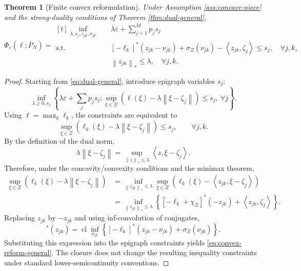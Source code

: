 \documentclass[11pt]{article}
\newtheorem{theorem}{Theorem}[section]
\newcommand{\XiSet}{\Xi}
\newcommand{\1}{\mathbf{1}}
\newcommand{\Pbar}{\bar P_N}
\newcommand{\inner}[2]{\left\langle #1,#2\right\rangle}
\newcommand{\norm}[1]{\left\lVert #1\right\rVert}
\DeclareMathOperator{\Cl}{cl}
\begin{document}
\begin{theorem}[Finite convex reformulation]\label{thm:convex-reform-general}
Under Assumption \ref{ass:concave-piece} and the strong-duality conditions of Theorem \ref{thm:dual-general},
\begin{equation}\label{eq:convex-reform-general}
\Phi_{\varepsilon}(\ell;\Pbar)=
\begin{aligned}[t]
\inf_{\lambda,s_j,z_{jk},\nu_{jk}}\quad
&\lambda\varepsilon+\sum_{j=1}^Mp_js_j\\
\mathrm{s.t.}\quad
&[-\ell_k]^*(z_{jk}-\nu_{jk})+\sigma_{\XiSet}(\nu_{jk})-\inner{z_{jk}}{\zeta_j}\le s_j,\quad \forall j,k,\\
&\norm{z_{jk}}_*\le\lambda,\quad \forall j,k.
\end{aligned}
\end{equation}
\end{theorem}

\begin{proof}
Starting from \eqref{eq:dual-general}, introduce epigraph variables $s_j$:
\begin{equation}
\inf_{\lambda\ge0,s_j}\left\{\lambda\varepsilon+\sum_jp_js_j:
\sup_{\xi\in\XiSet}\left(\ell(\xi)-\lambda\norm{\xi-\zeta_j}\right)\le s_j,\ \forall j\right\}.
\end{equation}
Using $\ell=\max_k\ell_k$, the constraints are equivalent to
\begin{equation}\label{eq:semiinf}
    \sup_{\xi\in\XiSet}\left(\ell_k(\xi)-\lambda\norm{\xi-\zeta_j}\right)\le s_j,
    \qquad \forall j,k.
\end{equation}
By the definition of the dual norm,
\begin{equation}
    \lambda\norm{\xi-\zeta_j}=\sup_{\norm{z}_{*}\le\lambda}\inner{z}{\xi-\zeta_j}.
\end{equation}
Therefore, under the concavity/convexity conditions and the minimax theorem,
\begin{align*}
\sup_{\xi\in\XiSet}\left(\ell_k(\xi)-\lambda\norm{\xi-\zeta_j}\right)
&=\inf_{\norm{z_{jk}}_*
\le\lambda}\sup_{\xi\in\XiSet}\left(\ell_k(\xi)-\inner{z_{jk}}{\xi-\zeta_j}\right)\\
&=\inf_{\norm{z_{jk}}_*
\le\lambda}\left\{[-\ell_k+\chi_{\XiSet}]^*(-z_{jk})+\inner{z_{jk}}{\zeta_j}\right\}.
\end{align*}
Replacing $z_{jk}$ by $-z_{jk}$ and using inf-convolution of conjugates,
\begin{equation}
[-\ell_k+\chi_{\XiSet}]^*(z_{jk})
=\Cl\inf_{\nu_{jk}}\left\{[-\ell_k]^*(z_{jk}-\nu_{jk})+\sigma_{\XiSet}(\nu_{jk})\right\}.
\end{equation}
Substituting this expression into the epigraph constraints yields \eqref{eq:convex-reform-general}. The closure does not change the resulting inequality constraints under standard lower-semicontinuity conventions.
\end{proof}
\end{document}
